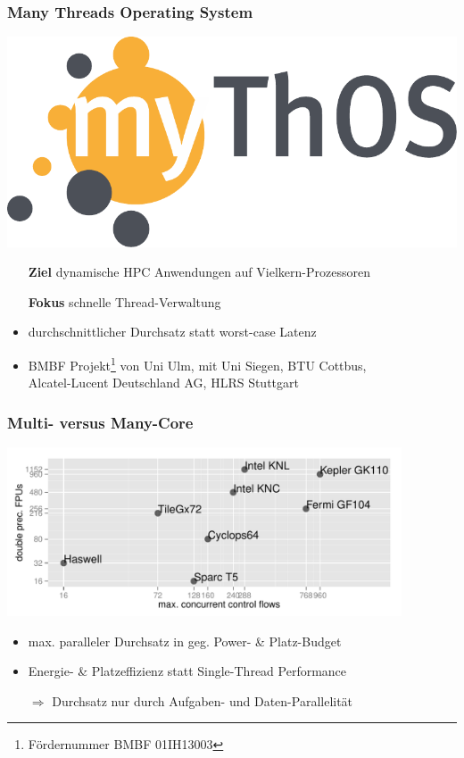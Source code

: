 \begin{frame}
  \frametitle{Many Threads Operating System}

  \begin{center}
    \includegraphics[scale=0.3]{mythos-logo}
  \end{center}
  \vspace{0.5cm}

  \begin{itemize}
  \item[\textbf{Ziel}] \alert{dynamische} HPC Anwendungen auf \alert{Vielkern-Prozessoren}
  \item[\textbf{Fokus}] schnelle Thread-Verwaltung
  \item durchschnittlicher Durchsatz statt worst-case Latenz
  \item BMBF Projekt\footnote{Fördernummer BMBF 01IH13003} von Uni Ulm, mit Uni Siegen, BTU Cottbus, \\ Alcatel-Lucent Deutschland AG, HLRS Stuttgart
  \end{itemize}
\end{frame}

\begin{frame}
  \frametitle{Multi- versus Many-Core}

  \includegraphics[height=5cm]{figures/manycore}

  \begin{itemize}
  \item max. paralleler Durchsatz in geg. Power- \& Platz-Budget 
  \item Energie- \& Platzeffizienz statt Single-Thread Performance 
  \item[$\Rightarrow$] \alert{Durchsatz nur durch Aufgaben- und Daten-Parallelität }
  \end{itemize}
\end{frame}

